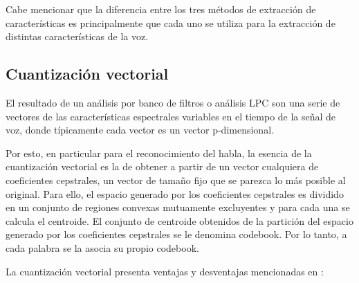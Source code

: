 Cabe mencionar que la diferencia entre los tres métodos de extracción de características es principalmente que cada uno se utiliza para la extracción de distintas características de la voz.

\subsection{Cuantización vectorial}

El resultado de un análisis por banco de filtros o análisis LPC son una serie de vectores de las características espectrales variables en el tiempo de la señal de voz, donde típicamente cada vector es un vector p-dimensional. \cite{Rabiner1993}

Por esto, en particular para el reconocimiento del habla, la esencia de la cuantización vectorial es la de obtener a partir de un vector cualquiera de coeficientes cepstrales, un vector de tamaño fijo que se parezca lo más posible al original. Para ello, el espacio generado por los coeficientes cepstrales es dividido en un conjunto de regiones convexas mutuamente excluyentes y para cada una se calcula el centroide. El conjunto de centroide obtenidos de la partición del espacio generado por los coeficientes cepstrales se le denomina codebook. Por lo tanto, a cada palabra se la asocia su propio codebook.

La cuantización vectorial presenta ventajas y desventajas mencionadas en \cite{Rabiner1993}:


